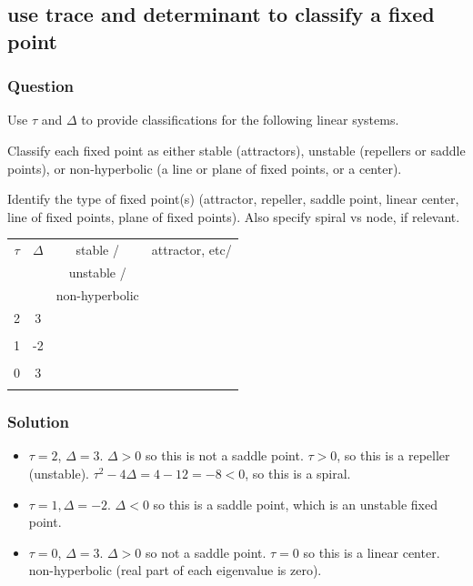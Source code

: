 \documentclass[12pt,letterpaper,noanswers]{exam}
\begin{document}
\subsection{use trace and determinant to classify a fixed point}
\subsubsection{Question}
Use $\tau$ and $\Delta$ to provide classifications for the following linear systems.  
\begin{parts}
\item Classify each fixed point as either stable (attractors), unstable (repellers or saddle points), or non-hyperbolic (a line or plane of fixed points, or a center). 
\item Identify the type of fixed point(s) (attractor, repeller, saddle point, linear center, line of fixed points, plane of fixed points).  Also specify spiral vs node, if relevant.
\end{parts} 

\begin{tabular}{|c|c|c|c|}
\hline
$\tau$ & $\Delta$ & stable / & attractor, etc/ \\
& & unstable / &  \\
& & non-hyperbolic & \\
\hline
2 & 3 & & \\
&  & & \\
\hline
 1    &  -2& & \\
     & & & \\
     \hline
 0  & 3 & & \\
     & & & \\
     \hline
\end{tabular}

\subsubsection{Solution}
\begin{itemize}
    \item $\tau = 2$, $\Delta = 3$.  $\Delta > 0$ so this is not a saddle point.  $\tau > 0$, so this is a repeller (unstable).  $\tau^2 - 4\Delta = 4 - 12 = -8<0$, so this is a spiral.
    \item $\tau = 1, \Delta = -2$.  $\Delta < 0$ so this is a saddle point, which is an unstable fixed point.
    \item $\tau = 0$, $\Delta = 3$.  $\Delta > 0$ so not a saddle point.  $\tau = 0$ so this is a linear center.  non-hyperbolic (real part of each eigenvalue is zero).
\end{itemize}
\end{document}
